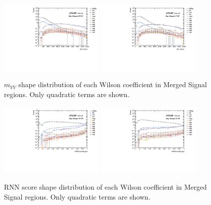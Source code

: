 \begin{figure}[]
    \centering
   \includegraphics[width=0.45\textwidth]{figures/aQGC/MllJ_SR_HP_aQGC.pdf}
   \includegraphics[width=0.45\textwidth]{figures/aQGC/MllJ_SR_LP_aQGC.pdf}
    \caption{$m_{VV}$ shape distribution of each Wilson coefficient in Merged Signal regions. Only quadratic terms are shown.}
    \label{fig:2lepaQGCshapeMVVh}
\end{figure}

\begin{figure}[]
    \centering
   \includegraphics[width=0.45\textwidth]{figures/aQGC/RNNScoreMerged_SR_HP_aQGC.pdf}
   \includegraphics[width=0.45\textwidth]{figures/aQGC/RNNScoreMerged_SR_LP_aQGC.pdf}
    \caption{RNN score shape distribution of each Wilson coefficient in Merged Signal regions. Only quadratic terms are shown.}
    \label{fig:2lepaQGCshapeRNNh}
\end{figure}


